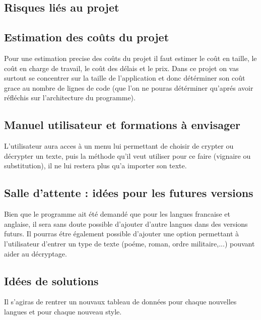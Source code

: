 \documentclass[a4]{article}
\begin{document}
		\subsection{Risques liés au projet}
		\subsection{Estimation des coûts du projet}
		 	Pour une estimation precise des coûts du projet il faut estimer le coût en taille, 
			le coût en charge de travail, le coût des délais et le prix. Dans ce projet on vas surtout 
			se concentrer sur la taille de l'application et donc détérminer son coût grace au nombre de 
			lignes de code (que l'on ne pouras détérminer qu'aprés avoir réfléchis sur l'architecture du 				programme).		  		
		\subsection{Manuel utilisateur et formations à envisager}
			L'utilisateur aura acces à un menu lui permettant de choisir de crypter ou décrypter un texte,
			puis la méthode qu'il veut utiliser pour ce faire (vignaire ou substitution), il ne lui restera 
			plus qu'a importer son texte.
		\subsection{Salle d’attente : idées pour les futures versions}
			Bien que le programme ait été demandé que pour les langues francaise et anglaise, 
			il sera sans doute possible d'ajouter d'autre langues dans des versions futurs. 
			Il pourras étre également possible d'ajouter une option permettant à l'utilisateur
			d'entrer un type de texte (poéme, roman, ordre militaire,...) pouvant aider au décryptage. 
		\subsection{Idées de solutions}
		 	Il s'agiras de rentrer un nouvaux tableau de données pour chaque nouvelles langues et pour 
			chaque nouveau style.
\end{document}
